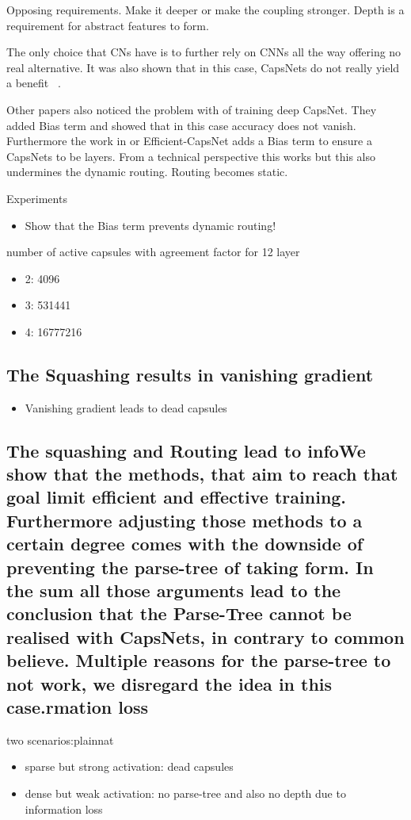 \documentclass{article}
\begin{document}
Opposing requirements. Make it deeper or make the coupling stronger.
Depth is a requirement for abstract features to form.

The only choice that CNs have is to further rely on CNNs all the way offering no real alternative.
It was also shown that in this case, CapsNets do not really yield a benefit ~\cite{acml/PaikKK19}.

Other papers also noticed the problem with of training deep CapsNet. They added Bias term and showed that in this case accuracy does not vanish.
Furthermore the work in \cite{prl/PeerSR21} or Efficient-CapsNet adds a Bias term to ensure a CapsNets to be layers.
From a technical perspective this works but this also undermines the dynamic routing.
Routing becomes static.

Experiments
\begin{itemize}
	\item Show that the Bias term prevents dynamic routing!
\end{itemize}

number of active capsules with agreement factor for 12 layer
\begin{itemize}
	\item 2: 4096
	\item 3: 531441
	\item 4: 16777216
\end{itemize}

\subsection{The Squashing results in vanishing gradient}
\begin{itemize}
	\item Vanishing gradient leads to dead capsules
\end{itemize}
\subsection{The squashing and Routing lead to infoWe show that the methods, that aim to reach that goal limit efficient and effective training.
	Furthermore adjusting those methods to a certain degree comes with the downside of preventing the parse-tree of taking form.
	In the sum all those arguments lead to the conclusion that the Parse-Tree cannot be realised with CapsNets, in contrary to common believe.
	Multiple reasons for the parse-tree to not work, we disregard the idea in this case.rmation loss}
two scenarios:plainnat
\begin{itemize}
	\item sparse but strong activation: dead capsules
	\item dense but weak activation: no parse-tree and also no depth due to information loss
\end{itemize}
\end{document}
